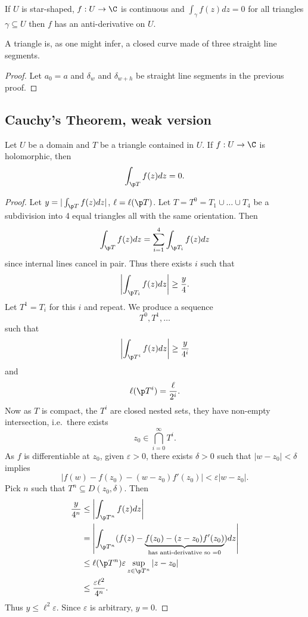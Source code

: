 \documentclass[a4paper]{article}
\begin{document}
\begin{corollary}\label{cor:anti-derivative}
  If \(U\) is star-shaped, \(f: U \to \C\) is continuous and \(\int_\gamma f(z)dz = 0\) for all triangles \(\gamma \subseteq U\) then \(f\) has an anti-derivative on \(U\).
\end{corollary}

A triangle is, as one might infer, a closed curve made of three straight line segments.

\begin{proof}
  Let \(a_0 = a\) and \(\delta_w\) and \(\delta_{w + h}\) be straight line segments in the previous proof.
\end{proof}

\subsection{Cauchy's Theorem, weak version}

\begin{theorem}
  \label{thm:weak Cauchy}
  Let \(U\) be a domain and \(T\) be a triangle contained in \(U\). If \(f: U \to \C\) is holomorphic, then
  \[
    \int_{\p T} f(z)dz = 0.
  \]
\end{theorem}

\begin{proof}
  Let \(y = |\int_{\p T} f(z)dz|\), \(\ell = \ell(\p T)\). Let \(T = T^0 = T_1 \cup \dots \cup T_4\) be a subdivision into 4 equal triangles all with the same orientation. Then
  \[
    \int_{\p T} f(z)dz = \sum_{i = 1}^4 \int_{\p T_i} f(z)dz
  \]
  since internal lines cancel in pair. Thus there exists \(i\) such that
  \[
    \left| \int_{\p T_i} f(z)dz \right| \geq \frac{y}{4}.
  \]
  Let \(T^1 = T_i\) for this \(i\) and repeat. We produce a sequence
  \[
    T^0, T^1, \dots
  \]
  such that
  \[
    \left| \int_{\p T^i} f(z)dz \right| \geq \frac{y}{4^i}
  \]
  and
  \[
    \ell(\p T^i) = \frac{\ell}{2^i}.
  \]
  Now as \(T\) is compact, the \(T^i\) are closed nested sets, they have non-empty intersection, i.e.\ there exists
  \[
    z_0 \in \bigcap_{i = 0}^\infty T^i.
  \]
  As \(f\) is differentiable at \(z_0\), given \(\varepsilon > 0\), there exists \(\delta > 0\) such that \(|w - z_0| < \delta\) implies
  \[
    |f(w) - f(z_0) - (w - z_0) f'(z_0)| < \varepsilon |w - z_0|.
  \]
  Pick \(n\) such that \(T^n \subseteq D(z_0, \delta)\). Then
  \begin{align*}
    \frac{y}{4^n} &\leq \left| \int_{\p T^n} f(z)dz \right| \\
                  &= \left| \int_{\p T^n} (f(z) - \underbrace{f(z_0) - (z - z_0)f'(z_0)}_{\text{has anti-derivative so } = 0}) dz \right| \\
                  &\leq \ell(\p T^n) \varepsilon \sup_{z \in \p T^n} |z - z_0| \\
                  &\leq \frac{\varepsilon \ell^2}{4^n}.
  \end{align*}
  Thus \(y \leq \ell^2 \varepsilon\). Since \(\varepsilon\) is arbitrary, \(y = 0\).
\end{proof}
\end{document}
